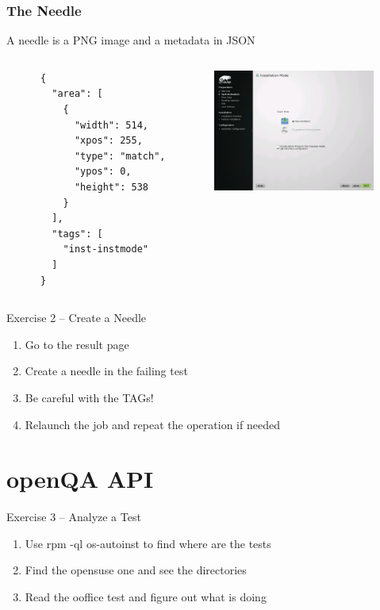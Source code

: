 \documentclass{beamer}
\begin{document}
%
%
\begin{frame}[fragile]
  \frametitle{The Needle}
  A needle is a PNG image and a metadata in JSON
  \begin{columns}
    \begin{column}{0.45\textwidth}
    \lstset{style=mybash}
    \begin{lstlisting}
      {
        "area": [
          {
            "width": 514,
            "xpos": 255,
            "type": "match",
            "ypos": 0,
            "height": 538
          }
        ],
        "tags": [
          "inst-instmode"
        ]
      }
    \end{lstlisting}
    \end{column}

    \begin{column}{0.45\textwidth}
      \includegraphics[height=4cm,width=5.33cm]{needle}
    \end{column}
  \end{columns}
\end{frame}

%
%
\begin{frame}{Exercise 2 -- Create a Needle}
  \begin{enumerate}
  \item Go to the result page
  \item Create a needle in the failing test
  \item Be careful with the TAGs!
  \item Relaunch the job and repeat the operation if needed
  \end{enumerate}
\end{frame}


\section{openQA API}
%
%
\begin{frame}{Exercise 3 -- Analyze a Test}
  \begin{enumerate}
  \item Use rpm -ql os-autoinst to find where are the tests
  \item Find the opensuse one and see the directories
  \item Read the ooffice test and figure out what is doing
  \end{enumerate}
\end{frame}
\end{document}
